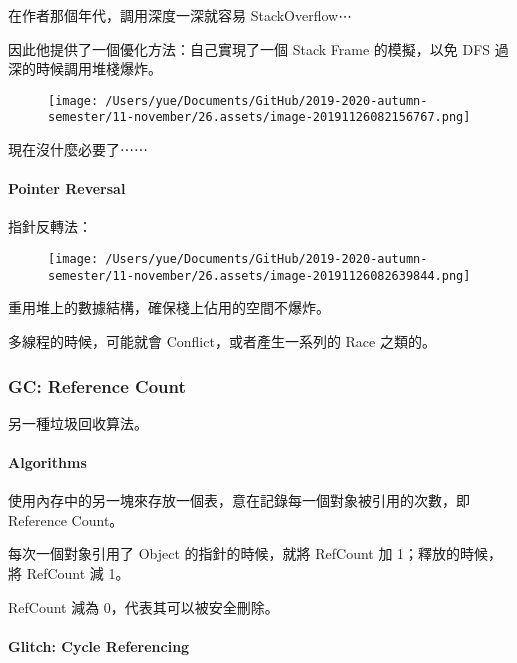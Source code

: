 \documentclass[
]{article}
\begin{document}
在作者那個年代，調用深度一深就容易 StackOverflow⋯

因此他提供了一個優化方法：自己實現了一個 Stack Frame 的模擬，以免 DFS
過深的時候調用堆棧爆炸。

\begin{figure}
\centering
\texttt{[image: /Users/yue/Documents/GitHub/2019-2020-autumn-semester/11-november/26.assets/image-20191126082156767.png]}
\caption{}
\end{figure}

現在沒什麼必要了⋯⋯

\hypertarget{header-n36}{%
\paragraph{Pointer Reversal}\label{header-n36}}

指針反轉法：

\begin{figure}
\centering
\texttt{[image: /Users/yue/Documents/GitHub/2019-2020-autumn-semester/11-november/26.assets/image-20191126082639844.png]}
\caption{}
\end{figure}

重用堆上的數據結構，確保棧上佔用的空間不爆炸。

多線程的時候，可能就會 Conflict，或者產生一系列的 Race 之類的。

\hypertarget{header-n41}{%
\subsubsection{GC: Reference Count}\label{header-n41}}

另一種垃圾回收算法。

\hypertarget{header-n43}{%
\paragraph{Algorithms}\label{header-n43}}

使用內存中的另一塊來存放一個表，意在記錄每一個對象被引用的次數，即
Reference Count。

每次一個對象引用了 Object 的指針的時候，就將 RefCount 加
1；釋放的時候，將 RefCount 減 1。

RefCount 減為 0，代表其可以被安全刪除。

\hypertarget{header-n47}{%
\paragraph{Glitch: Cycle Referencing}\label{header-n47}}
\end{document}
